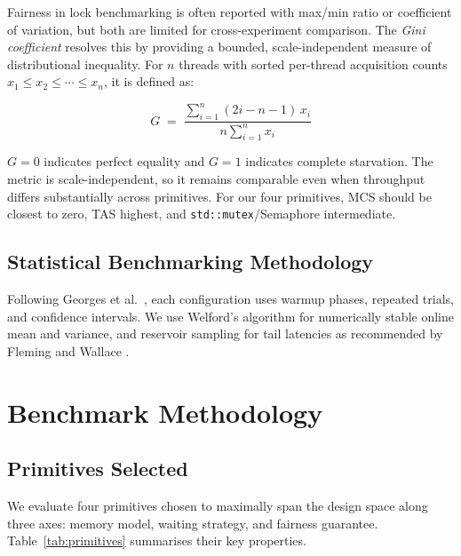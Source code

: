 \documentclass[conference]{IEEEtran}
\begin{document}
Fairness in lock benchmarking is often reported with max/min ratio or coefficient of variation, but both are limited for cross-experiment comparison. The \emph{Gini coefficient} \cite{gini1921} resolves this by providing a bounded, scale-independent measure of distributional inequality. For $n$ threads with sorted per-thread acquisition counts $x_1 \leq x_2 \leq \cdots \leq x_n$, it is defined as:

\begin{equation}
G \;=\; \frac{\displaystyle\sum_{i=1}^{n}(2i - n - 1)\,x_i}
             {n\displaystyle\sum_{i=1}^{n} x_i}
\label{eq:gini}
\end{equation}

\noindent $G = 0$ indicates perfect equality and $G = 1$ indicates complete starvation. The metric is scale-independent, so it remains comparable even when throughput differs substantially across primitives. For our four primitives, MCS should be closest to zero, TAS highest, and \texttt{std::mutex}/Semaphore intermediate.

\subsection{Statistical Benchmarking Methodology}

Following Georges et al.\ \cite{georges2007statistically}, each configuration uses warmup phases, repeated trials, and confidence intervals. We use Welford's algorithm \cite{welford1962} for numerically stable online mean and variance, and reservoir sampling for tail latencies as recommended by Fleming and Wallace \cite{fleming1986}.

\section{Benchmark Methodology}
\label{sec:methodology}

\subsection{Primitives Selected}

We evaluate four primitives chosen to maximally span the design space along three axes: memory model, waiting strategy, and fairness guarantee.
Table~\ref{tab:primitives} summarises their key properties.
\end{document}

